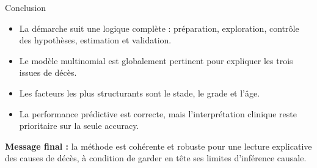 \documentclass[10pt,aspectratio=169]{beamer}
\begin{document}
\begin{frame}{Conclusion}
\begin{itemize}
  \item La démarche suit une logique complète : préparation, exploration, contrôle des hypothèses, estimation et validation.
  \item Le modèle multinomial est globalement pertinent pour expliquer les trois issues de décès.
  \item Les facteurs les plus structurants sont le stade, le grade et l’âge.
  \item La performance prédictive est correcte, mais l’interprétation clinique reste prioritaire sur la seule accuracy.
\end{itemize}
\vspace{0.7em}
\centering
\textbf{Message final :} la méthode est cohérente et robuste pour une lecture explicative des causes de décès, à condition de garder en tête ses limites d’inférence causale.
\end{frame}
\end{document}
